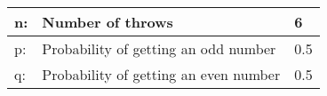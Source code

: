 \begin{tabular}{|l|l|l|}\hline
n:	&Number of throws	&6\\\hline
p:	&Probability of getting an odd number	&0.5\\\hline
q:	&Probability of getting an even number	&0.5\\\hline
\end{tabular}
